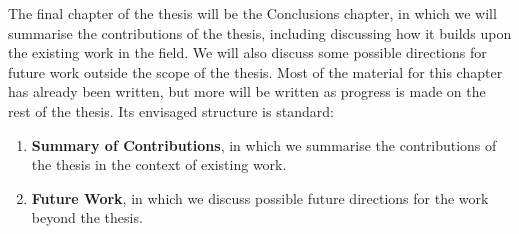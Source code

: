 \documentclass[a4paper,10pt]{report}
\let\olditem\item
\renewcommand{\item}[1][]{\olditem{\bfseries #1}}
\begin{document}
The final chapter of the thesis will be the Conclusions chapter, in
which we will summarise the contributions of the thesis, including
discussing how it builds upon the existing work in the field.
We will also discuss some possible directions for future work outside
the scope of the thesis.
Most of the material for this chapter has already been written, but
more will be written as progress is made on the rest of the thesis.
Its envisaged structure is standard:
\begin{enumerate}
\item[Summary of Contributions], in which we summarise the
  contributions of the thesis in the context of existing work.
\item[Future Work], in which we discuss possible future directions for
  the work beyond the thesis.
\end{enumerate}



\printbibliography
\end{document}

